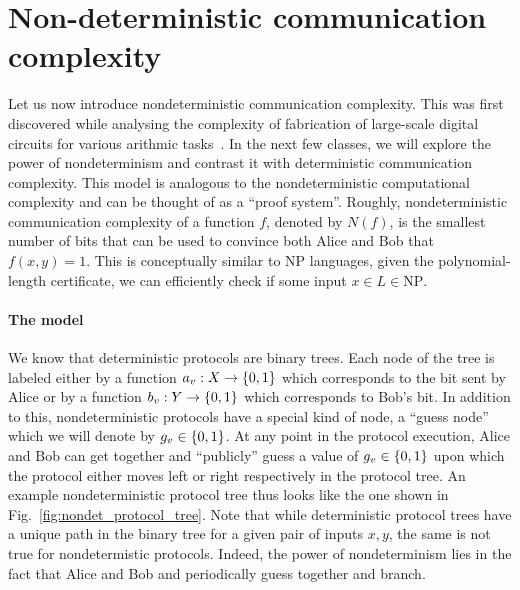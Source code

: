 \documentclass[usletter]{article}
\providecommand\cbrac[1]{\ensuremath \left\{#1\right\}}
\newcommand{\X}{X}
\newcommand{\Y}{Y}
\newcommand{\nf}{N(f)}
\begin{document}
\section{Non-deterministic communication complexity}

Let us now introduce nondeterministic communication complexity. This was first discovered while analysing the complexity of fabrication of large-scale digital circuits for various arithmic tasks~\cite{lipton1981lower}. In the next few classes, we will explore the power of nondeterminism and contrast it with deterministic communication complexity. This model is analogous to the nondeterministic computational complexity and can be thought of as a ``proof system''. Roughly, nondeterministic communication complexity of a function $f$, denoted by $\nf$, is the smallest number of bits that can be used to convince both Alice and Bob that $f(x,y) = 1$. This is conceptually similar to $\mathrm{NP}$ languages, given the polynomial-length certificate, we can efficiently check if some input $x \in L \in \mathrm{NP}$.

\paragraph{The model}

We know that deterministic protocols are binary trees. Each node of the tree is labeled either by a function $a_v : \X \to \cbrac{0,1}$ which corresponds to the bit sent by Alice or by a function $b_v : \Y \to \cbrac{0,1}$ which corresponds to Bob's bit. In addition to this, nondeterministic protocols have a special kind of node, a ``guess node'' which we will denote by $g_v \in \cbrac{0,1}$. At any point in the protocol execution, Alice and Bob can get together and ``publicly'' guess a value of $g_v \in \cbrac{0,1}$ upon which the protocol either moves left or right respectively in the protocol tree. An example nondeterministic protocol tree thus looks like the one shown in Fig.~\ref{fig:nondet_protocol_tree}. Note that while deterministic protocol trees have a unique path in the binary tree for a given pair of inputs $x, y$, the same is not true for nondetermistic protocols. Indeed, the power of nondeterminism lies in the fact that Alice and Bob and periodically guess together and branch.
\end{document}
